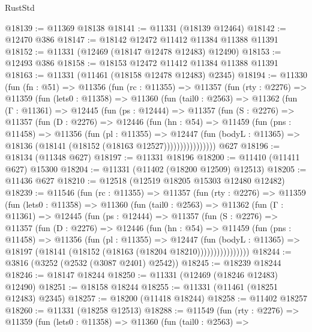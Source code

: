 \begin{lexlean}{RustStd}
\begin{coremodule}
@18139 := @11369 @18138
@18141 := @11331 (@18139 @12464)
@18142 := @12470 @386
@18147 := @18142 @12472 @11412 @11384 @11388 @11391
@18152 := @11331 (@12469 (@18147 @12478 @12483) @12490)
@18153 := @12493 @386
@18158 := @18153 @12472 @11412 @11384 @11388 @11391
@18163 := @11331 (@11461 (@18158 @12478 @12483) @2345)
@18194 := @11330
    (fun (fn : @51) =>
    @11356
      (fun (rc : @11355) =>
      @11357
        (fun (rty : @2276) =>
        @11359
          (fun (lets0 : @11358) =>
          @11360
            (fun (tail0 : @2563) =>
            @11362
              (fun (Γ : @11361) =>
              @12445
                (fun (ps : @12444) =>
                @11357
                  (fun (S : @2276) =>
                  @11357
                    (fun (D : @2276) =>
                    @12446
                      (fun (hn : @54) =>
                      @11459
                        (fun (pns : @11458) =>
                        @11356
                          (fun (pl : @11355) =>
                          @12447
                            (fun (bodyL : @11365) =>
                            @18136 (@18141 (@18152 (@18163 @12527))))))))))))))))
    @627
@18196 := @18134 (@11348 @627)
@18197 := @11331 @18196
@18200 := @11410 (@11411 @627) @15300
@18204 := @11331 (@11402 (@18200 @12509) @12513)
@18205 := @11436 @627
@18210 := @12518 (@12519 @18205 @15303 @12480 @12482)
@18239 := @11546
    (fun (rc : @11355) =>
    @11357
      (fun (rty : @2276) =>
      @11359
        (fun (lets0 : @11358) =>
        @11360
          (fun (tail0 : @2563) =>
          @11362
            (fun (Γ : @11361) =>
            @12445
              (fun (ps : @12444) =>
              @11357
                (fun (S : @2276) =>
                @11357
                  (fun (D : @2276) =>
                  @12446
                    (fun (hn : @54) =>
                    @11459
                      (fun (pns : @11458) =>
                      @11356
                        (fun (pl : @11355) =>
                        @12447
                          (fun (bodyL : @11365) =>
                          @18197 (@18141 (@18152 (@18163 (@18204 @18210))))))))))))))))
@18244 := @3816 (@3252 (@2532 (@3087 @2401) @2542))
@18245 := @18239 @18244
@18246 := @18147 @18244
@18250 := @11331 (@12469 (@18246 @12483) @12490)
@18251 := @18158 @18244
@18255 := @11331 (@11461 (@18251 @12483) @2345)
@18257 := @18200 (@11418 @18244)
@18258 := @11402 @18257
@18260 := @11331 (@18258 @12513)
@18288 := @11549
    (fun (rty : @2276) =>
    @11359
      (fun (lets0 : @11358) =>
      @11360
        (fun (tail0 : @2563) =>

\end{coremodule}
\end{lexlean}
